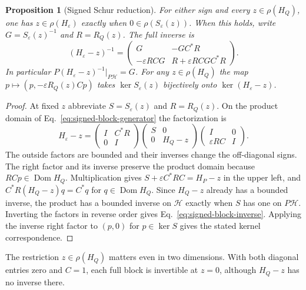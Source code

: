 \documentclass[11pt]{article}
\newtheorem{proposition}{Proposition}[section]
\theoremstyle{definition}
\begin{document}
\begin{proposition}[Signed Schur reduction]
\label{prop:signed-schur}
For either sign and every $z\in\rho(H_Q)$, one has $z\in\rho(H_\varepsilon)$ exactly when $0\in\rho(S_\varepsilon(z))$. When this holds, write $G=S_\varepsilon(z)^{-1}$ and $R=R_Q(z)$. The full inverse is
\begin{equation}
 (H_\varepsilon-z)^{-1}=
 \begin{pmatrix}
 G&-GC^*R\\
 -\varepsilon RCG&R+\varepsilon RCGC^*R
 \end{pmatrix}.
 \label{eq:signed-block-inverse}
\end{equation}
In particular $P(H_\varepsilon-z)^{-1}\vert_{P\mathcal H}=G$. For any $z\in\rho(H_Q)$ the map $p\mapsto (p,-\varepsilon R_Q(z)Cp)$ takes $\ker S_\varepsilon(z)$ bijectively onto $\ker(H_\varepsilon-z)$.
\end{proposition}
\begin{proof}
At fixed $z$ abbreviate $S=S_\varepsilon(z)$ and $R=R_Q(z)$. On the product domain of Eq.~\eqref{eq:signed-block-generator} the factorization is
\begin{equation}
 H_\varepsilon-z=
 \begin{pmatrix}I&C^*R\\0&I\end{pmatrix}
 \begin{pmatrix}S&0\\0&H_Q-z\end{pmatrix}
 \begin{pmatrix}I&0\\\varepsilon RC&I\end{pmatrix}.
 \label{eq:signed-schur-factorization}
\end{equation}
The outside factors are bounded and their inverses change the off-diagonal signs. The right factor and its inverse preserve the product domain because $RCp\in\operatorname{Dom}H_Q$. Multiplication gives $S+\varepsilon C^*RC=H_P-z$ in the upper left, and $C^*R(H_Q-z)q=C^*q$ for $q\in\operatorname{Dom}H_Q$. Since $H_Q-z$ already has a bounded inverse, the product has a bounded inverse on $\mathcal H$ exactly when $S$ has one on $P\mathcal H$. Inverting the factors in reverse order gives Eq.~\eqref{eq:signed-block-inverse}. Applying the inverse right factor to $(p,0)$ for $p\in\ker S$ gives the stated kernel correspondence.
\end{proof}

The restriction $z\in\rho(H_Q)$ matters even in two dimensions. With both diagonal entries zero and $C=1$, each full block is invertible at $z=0$, although $H_Q-z$ has no inverse there.
\end{document}
